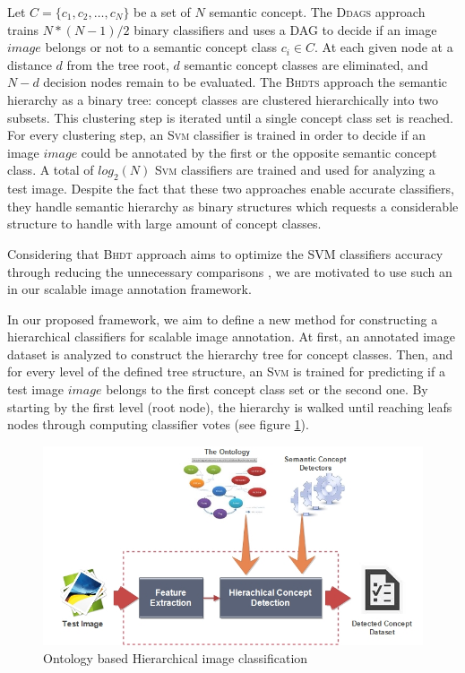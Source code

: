 	Let $C = \{c_{1} , c_{2}  , \dots , c_{N}\}$ be a set of $N$ semantic concept. 
	The \textsc{Ddags} approach trains $N * (N-1)/2$ binary classifiers and uses a 
	\textsc{DAG} to decide if an image $image$ belongs or not to a semantic concept 
	class $c_{i} \in C$. At each given node at a distance $d$ from the tree root, $d$
	semantic concept classes are eliminated, and $N-d$ decision nodes remain to be evaluated. 
	The \textsc{Bhdts} approach  the semantic hierarchy as a binary tree: concept 
	classes are clustered hierarchically into two subsets. This clustering step is iterated 
	until a single concept class set is reached. For every clustering step,  an \textsc{Svm} 
	classifier is trained in order to decide if an image $image$ could be annotated by the first or 
	the opposite semantic concept class. A total of $log_{2}(N)$ \textsc{Svm} classifiers are 
	trained and used for analyzing a test image.  Despite the fact that these two approaches enable 
	accurate classifiers, they handle semantic hierarchy as binary structures which requests 
	a considerable structure to handle with large amount of concept classes.

	Considering that \textsc{Bhdt} approach aims to optimize the \textsc{SVM} classifiers 
	accuracy through reducing the unnecessary comparisons \citep{Cevikalp2010}, 
	we are motivated to use such an  in our scalable image annotation framework.

	In our proposed framework, we aim to define a new method for constructing a hierarchical 
	classifiers for scalable image annotation. At first, an annotated image dataset is analyzed to 
	construct the hierarchy tree for concept classes. Then, and for every level of the defined 
	tree structure, an \textsc{Svm} is trained for predicting if a test image $image$ belongs 
	to the first concept class set or the second one. By starting by the first level  (root node), 
	the hierarchy is walked until reaching leafs nodes through computing classifier votes  (see figure \ref{fig3_2}).

	\begin{figure}[ht!]
		\centering
		\includegraphics[scale=0.7]{graphics/contrib3:figure2}
		\caption{Ontology based Hierarchical image classification}
		\label{fig3_2}
	\end{figure}

